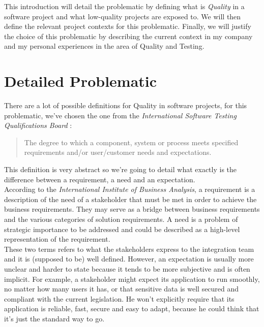 This introduction will detail the problematic by defining what is
\textit{Quality} in a software project and what low-quality projects are
exposed to.
We will then define the relevant project contexts for this problematic.
Finally, we will justify the choice of this problematic by describing the
current context in my company and my personal experiences in the area of
Quality and Testing.

\section{Detailed Problematic}\label{sec:detailed-problematic}

There are a lot of possible definitions for Quality in software projects, for
this problematic, we've chosen the one from the \textit{International Software
Testing Qualifications Board} :
\begin{quote}
The degree to which a component, system or process meets specified
requirements and/or user/customer needs and expectations.
\end{quote}
This definition is very abstract so we're going to detail what exactly is the
difference between a requirement, a need and an expectation. \\
According to the \textit{International Institute of Business Analysis}, a
requirement is a description of the need of a stakeholder that must be met in
order to achieve the business requirements.
They may serve as a bridge between business requirements and the various
categories of solution requirements.
A need is a problem of strategic importance to be addressed and could be
described as a high-level representation of the requirement. \\
These two terms refers to what the stakeholders express to the integration
team and it is (supposed to be) well defined.
However, an expectation is usually more unclear and harder to state because
it tends to be more subjective and is often implicit.
For example, a stakeholder might expect its application to run smoothly, no
matter how many users it has, or that sensitive data is well secured and
compliant with the current legislation.
He won't explicitly require that its application is reliable, fast, secure
and easy to adapt, because he could think that it's just the standard way to go.
